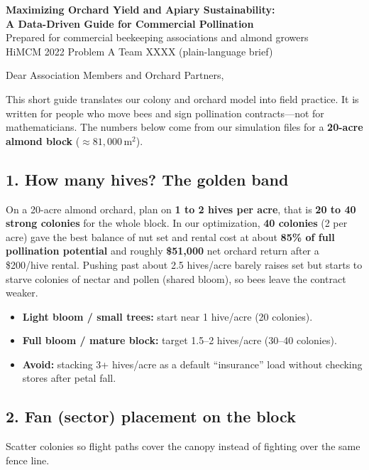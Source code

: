 \documentclass[11pt]{article}
\begin{document}
\begin{center}
{\Large\bfseries Maximizing Orchard Yield and Apiary Sustainability:}\\[0.25em]
{\Large\bfseries A Data-Driven Guide for Commercial Pollination}\\[0.6em]
{\normalsize Prepared for commercial beekeeping associations and almond
growers}\\[0.2em]
{\small HiMCM 2022 Problem A \quad Team XXXX \quad (plain-language brief)}
\end{center}

\vspace{0.6em}
\noindent
Dear Association Members and Orchard Partners,

This short guide translates our colony and orchard model into field
practice. It is written for people who move bees and sign pollination
contracts---not for mathematicians. The numbers below come from our
simulation files for a \textbf{20-acre almond block}
(\(\approx 81{,}000\,\mathrm{m}^2\)).

\subsection*{1. How many hives? The golden band}
On a 20-acre almond orchard, plan on \textbf{1 to 2 hives per acre}, that
is \textbf{20 to 40 strong colonies} for the whole block. In our
optimization, \textbf{40 colonies} (2 per acre) gave the best balance of
nut set and rental cost at about \textbf{85\% of full pollination
potential} and roughly \textbf{\$51{,}000} net orchard return after a
\$200/hive rental. Pushing past about 2.5 hives/acre barely raises set
but starts to starve colonies of nectar and pollen (shared bloom), so
bees leave the contract weaker.

\begin{itemize}[leftmargin=1.2em]
  \item \textbf{Light bloom / small trees:} start near 1 hive/acre (20
        colonies).
  \item \textbf{Full bloom / mature block:} target 1.5--2 hives/acre
        (30--40 colonies).
  \item \textbf{Avoid:} stacking 3+ hives/acre as a default ``insurance''
        load without checking stores after petal fall.
\end{itemize}

\subsection*{2. Fan (sector) placement on the block}
Scatter colonies so flight paths cover the canopy instead of fighting
over the same fence line.
\end{document}
